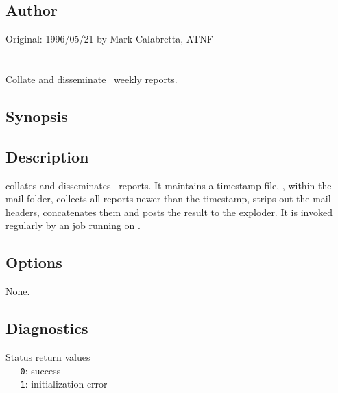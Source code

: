 \subsection*{Author}

Original: 1996/05/21 by Mark Calabretta, ATNF


\newpage
\section{}
\label{reap}

Collate and disseminate \aipspp\ weekly reports.

\subsection*{Synopsis}
 
\begin{synopsis}
\end{synopsis}
 
\subsection*{Description}
 
 collates and disseminates \aipspp\ reports.  It maintains a
timestamp file, , within the \mbox{} mail
folder, collects all reports newer than the timestamp, strips out the mail
headers, concatenates them and posts the result to the
\mbox{} exploder.  It is invoked regularly by an
  job running on .

\subsection*{Options}
 
None.

\subsection*{Diagnostics}
 
Status return values
\\ \verb+   0+: success
\\ \verb+   1+: initialization error

